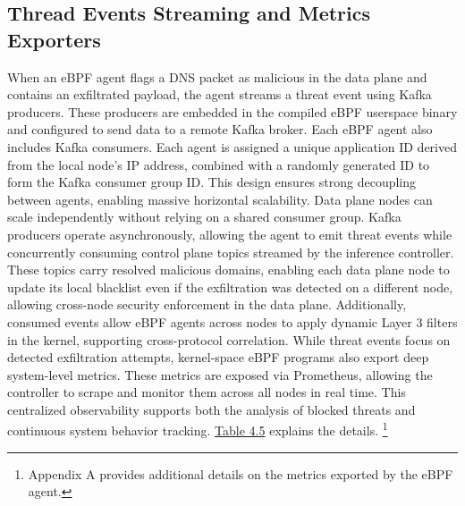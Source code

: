 \documentclass [11pt, proquest] {uwthesis}[2020/02/24]
\begin{document}
\subsection{Thread Events Streaming and Metrics Exporters}
\label{sec:threat-event-streaming}
When an eBPF agent flags a DNS packet as malicious in the data plane and contains an exfiltrated payload, the agent streams a threat event using Kafka producers. These producers are embedded in the compiled eBPF userspace binary and configured to send data to a remote Kafka broker. Each eBPF agent also includes Kafka consumers. Each agent is assigned a unique application ID derived from the local node’s IP address, combined with a randomly generated ID to form the Kafka consumer group ID. This design ensures strong decoupling between agents, enabling massive horizontal scalability. Data plane nodes can scale independently without relying on a shared consumer group. Kafka producers operate asynchronously, allowing the agent to emit threat events while concurrently consuming control plane topics streamed by the inference controller. These topics carry resolved malicious domains, enabling each data plane node to update its local blacklist even if the exfiltration was detected on a different node, allowing cross-node security enforcement in the data plane. Additionally, consumed events allow eBPF agents across nodes to apply dynamic Layer 3 filters in the kernel, supporting cross-protocol correlation. While threat events focus on detected exfiltration attempts, kernel-space eBPF programs also export deep system-level metrics. These metrics are exposed via Prometheus, allowing the controller to scrape and monitor them across all nodes in real time. This centralized observability supports both the analysis of blocked threats and continuous system behavior tracking. \hyperref[tab:kafka-topics]{Table 4.5} explains the details.
\footnote{Appendix A provides additional details on the metrics exported by the eBPF agent.}
\end{document}
